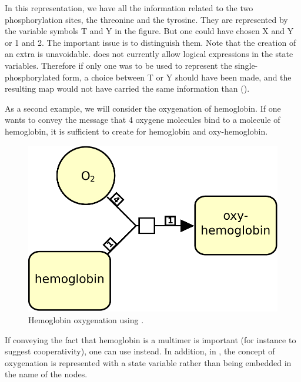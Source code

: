 In this representation, we have all the information related to the two phosphorylation sites, the threonine and the tyrosine. They are represented by the variable symbols T and Y in the figure. But one could have chosen X and Y or 1 and 2. The important issue is to distinguish them. Note that the creation of an extra  is unavoidable. \SBGNPDLone does not currently allow logical expressions in the state variables. Therefore if only one  was to be used to represent the single-phosphorylated form, a choice between T or Y should have been made, and the resulting map would not have carried the same information than  ().

As a second example, we will consider the oxygenation of hemoglobin. If one wants to convey the message that 4 oxygene molecules bind to a molecule of hemoglobin, it is sufficient to create  for hemoglobin and oxy-hemoglobin. 

\begin{figure}[H]
  \centering
  \includegraphics[scale = 0.4]{images/hemoglobin-macromolecule}
  \caption{Hemoglobin oxygenation using .}
  \label{fig:hemoglobin-macromolecule}
\end{figure}

If conveying the fact that hemoglobin is a multimer is important (for instance to suggest cooperativity), one can use  instead. In addition, in , the concept of oxygenation is represented with a state variable rather than being embedded in the name of the nodes.

